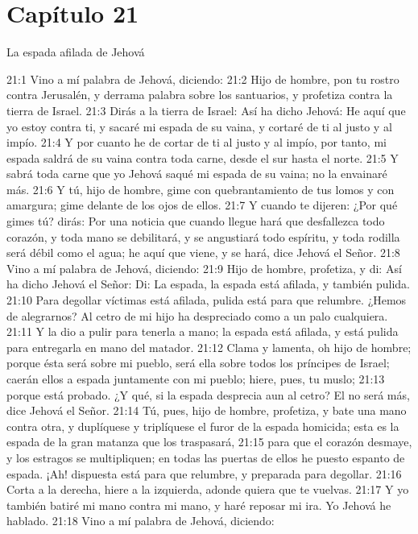 \section*{Capítulo 21 } 
La espada afilada de Jehová   
  
21:1 Vino a mí palabra de Jehová, diciendo:   
21:2 Hijo de hombre, pon tu rostro contra Jerusalén, y derrama palabra sobre los santuarios, y profetiza contra la tierra de Israel.   
21:3 Dirás a la tierra de Israel: Así ha dicho Jehová: He aquí que yo estoy contra ti, y sacaré mi espada de su vaina, y cortaré de ti al justo y al impío.   
21:4 Y por cuanto he de cortar de ti al justo y al impío, por tanto, mi espada saldrá de su vaina contra toda carne, desde el sur hasta el norte.   
21:5 Y sabrá toda carne que yo Jehová saqué mi espada de su vaina; no la envainaré más.   
21:6 Y tú, hijo de hombre, gime con quebrantamiento de tus lomos y con amargura; gime delante de los ojos de ellos.   
21:7 Y cuando te dijeren: ¿Por qué gimes tú? dirás: Por una noticia que cuando llegue hará que desfallezca todo corazón, y toda mano se debilitará, y se angustiará todo espíritu, y toda rodilla será débil como el agua; he aquí que viene, y se hará, dice Jehová el Señor.   
21:8 Vino a mí palabra de Jehová, diciendo:   
21:9 Hijo de hombre, profetiza, y di: Así ha dicho Jehová el Señor: Di: La espada, la espada está afilada, y también pulida.   
21:10 Para degollar víctimas está afilada, pulida está para que relumbre. ¿Hemos de alegrarnos? Al cetro de mi hijo ha despreciado como a un palo cualquiera.   
21:11 Y la dio a pulir para tenerla a mano; la espada está afilada, y está pulida para entregarla en mano del matador.   
21:12 Clama y lamenta, oh hijo de hombre; porque ésta será sobre mi pueblo, será ella sobre todos los príncipes de Israel; caerán ellos a espada juntamente con mi pueblo; hiere, pues, tu muslo;   
21:13 porque está probado. ¿Y qué, si la espada desprecia aun al cetro? El no será más, dice Jehová el Señor.   
21:14 Tú, pues, hijo de hombre, profetiza, y bate una mano contra otra, y duplíquese y triplíquese el furor de la espada homicida; esta es la espada de la gran matanza que los traspasará,   
21:15 para que el corazón desmaye, y los estragos se multipliquen; en todas las puertas de ellos he puesto espanto de espada. ¡Ah! dispuesta está para que relumbre, y preparada para degollar.   
21:16 Corta a la derecha, hiere a la izquierda, adonde quiera que te vuelvas.   
21:17 Y yo también batiré mi mano contra mi mano, y haré reposar mi ira. Yo Jehová he hablado.   
21:18 Vino a mí palabra de Jehová, diciendo:   
